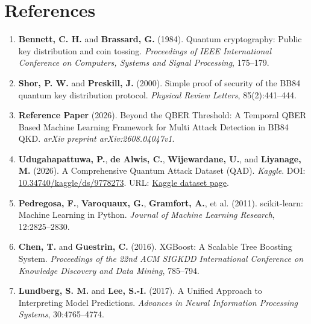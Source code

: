 \documentclass[a4paper,11pt]{article}
\begin{document}
\clearpage
\section*{References}

\begin{enumerate}
\item \textbf{Bennett, C. H.} and \textbf{Brassard, G.} (1984). Quantum cryptography: Public key distribution and coin tossing. \textit{Proceedings of IEEE International Conference on Computers, Systems and Signal Processing}, 175--179.

\item \textbf{Shor, P. W.} and \textbf{Preskill, J.} (2000). Simple proof of security of the BB84 quantum key distribution protocol. \textit{Physical Review Letters}, 85(2):441--444.

\item \textbf{Reference Paper} (2026). Beyond the QBER Threshold: A Temporal QBER Based Machine Learning Framework for Multi Attack Detection in BB84 QKD. \textit{arXiv preprint arXiv:2608.04047v1}.

\item \textbf{Udugahapattuwa, P.}, \textbf{de Alwis, C.},
\textbf{Wijewardane, U.}, and \textbf{Liyanage, M.} (2026).
A Comprehensive Quantum Attack Dataset (QAD).
\textit{Kaggle}. DOI: \href{https://doi.org/10.34740/kaggle/ds/9778273}
{10.34740/kaggle/ds/9778273}.
URL: \href{https://www.kaggle.com/datasets/dpdu1995/a-comprehensive-quantum-attack-dataset-qad}
{Kaggle dataset page}.

\item \textbf{Pedregosa, F.}, \textbf{Varoquaux, G.}, \textbf{Gramfort, A.}, et al. (2011). scikit-learn: Machine Learning in Python. \textit{Journal of Machine Learning Research}, 12:2825--2830.

\item \textbf{Chen, T.} and \textbf{Guestrin, C.} (2016). XGBoost: A Scalable Tree Boosting System. \textit{Proceedings of the 22nd ACM SIGKDD International Conference on Knowledge Discovery and Data Mining}, 785--794.

\item \textbf{Lundberg, S. M.} and \textbf{Lee, S.-I.} (2017). A Unified Approach to Interpreting Model Predictions. \textit{Advances in Neural Information Processing Systems}, 30:4765--4774.
\end{enumerate}
\end{document}
